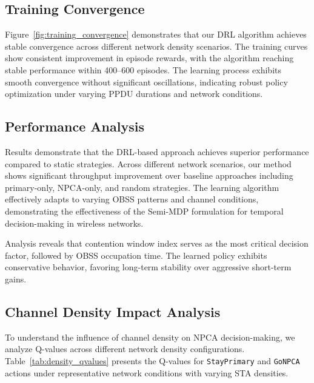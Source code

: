 \documentclass[conference]{IEEEtran}
\begin{document}
\subsection{Training Convergence}

Figure~\ref{fig:training_convergence} demonstrates that our DRL algorithm achieves stable convergence across different network density scenarios. The training curves show consistent improvement in episode rewards, with the algorithm reaching stable performance within 400--600 episodes. The learning process exhibits smooth convergence without significant oscillations, indicating robust policy optimization under varying PPDU durations and network conditions.

\subsection{Performance Analysis}

Results demonstrate that the DRL-based approach achieves superior performance compared to static strategies. Across different network scenarios, our method shows significant throughput improvement over baseline approaches including primary-only, NPCA-only, and random strategies. The learning algorithm effectively adapts to varying OBSS patterns and channel conditions, demonstrating the effectiveness of the Semi-MDP formulation for temporal decision-making in wireless networks.

Analysis reveals that contention window index serves as the most critical decision factor, followed by OBSS occupation time. The learned policy exhibits conservative behavior, favoring long-term stability over aggressive short-term gains.

\subsection{Channel Density Impact Analysis}

To understand the influence of channel density on NPCA decision-making, we analyze Q-values across different network density configurations. Table~\ref{tab:density_qvalues} presents the Q-values for \texttt{StayPrimary} and \texttt{GoNPCA} actions under representative network conditions with varying STA densities.
\end{document}
